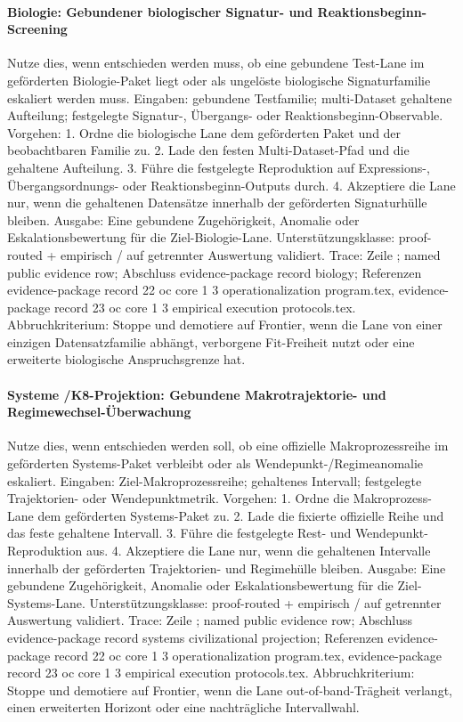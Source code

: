 \paragraph{Biologie: Gebundener biologischer Signatur- und Reaktionsbeginn-Screening}
Nutze dies, wenn entschieden werden muss, ob eine gebundene Test-Lane im geförderten Biologie-Paket liegt oder als ungelöste biologische Signaturfamilie eskaliert werden muss.
Eingaben: gebundene Testfamilie; \allowbreak multi-Dataset gehaltene Aufteilung; \allowbreak festgelegte Signatur-, Übergangs- oder Reaktionsbeginn-Observable.
Vorgehen: 1. Ordne die biologische Lane dem geförderten Paket und der beobachtbaren Familie zu. 2. Lade den festen Multi-Dataset-Pfad und die gehaltene Aufteilung. 3. Führe die festgelegte Reproduktion auf Expressions-, Übergangsordnungs- oder Reaktionsbeginn-Outputs durch. 4. Akzeptiere die Lane nur, wenn die gehaltenen Datensätze innerhalb der geförderten Signaturhülle bleiben.
Ausgabe: Eine gebundene Zugehörigkeit, Anomalie oder Eskalationsbewertung für die Ziel-Biologie-Lane.
Unterstützungsklasse: proof-routed + empirisch / auf getrennter Auswertung validiert.
Trace: Zeile ; named public evidence row; \allowbreak Abschluss evidence-package record biology; \allowbreak Referenzen evidence-package record 22 oc core 1 3 operationalization program.tex, \allowbreak evidence-package record 23 oc core 1 3 empirical execution protocols.tex.
Abbruchkriterium: Stoppe und demotiere auf Frontier, wenn die Lane von einer einzigen Datensatzfamilie abhängt, verborgene Fit-Freiheit nutzt oder eine erweiterte biologische Anspruchsgrenze hat.

\paragraph{Systeme /\allowbreak K8-Projektion: Gebundene Makrotrajektorie- und Regimewechsel-Überwachung}
Nutze dies, wenn entschieden werden soll, ob eine offizielle Makroprozessreihe im geförderten Systems-Paket verbleibt oder als Wendepunkt-/Regimeanomalie eskaliert.
Eingaben: Ziel-Makroprozessreihe; \allowbreak gehaltenes Intervall; \allowbreak festgelegte Trajektorien- oder Wendepunktmetrik.
Vorgehen: 1. Ordne die Makroprozess-Lane dem geförderten Systems-Paket zu. 2. Lade die fixierte offizielle Reihe und das feste gehaltene Intervall. 3. Führe die festgelegte Rest- und Wendepunkt-Reproduktion aus. 4. Akzeptiere die Lane nur, wenn die gehaltenen Intervalle innerhalb der geförderten Trajektorien- und Regimehülle bleiben.
Ausgabe: Eine gebundene Zugehörigkeit, Anomalie oder Eskalationsbewertung für die Ziel-Systems-Lane.
Unterstützungsklasse: proof-routed + empirisch / auf getrennter Auswertung validiert.
Trace: Zeile ; named public evidence row; \allowbreak Abschluss evidence-package record systems civilizational projection; \allowbreak Referenzen evidence-package record 22 oc core 1 3 operationalization program.tex, \allowbreak evidence-package record 23 oc core 1 3 empirical execution protocols.tex.
Abbruchkriterium: Stoppe und demotiere auf Frontier, wenn die Lane out-of-band-Trägheit verlangt, einen erweiterten Horizont oder eine nachträgliche Intervallwahl.


